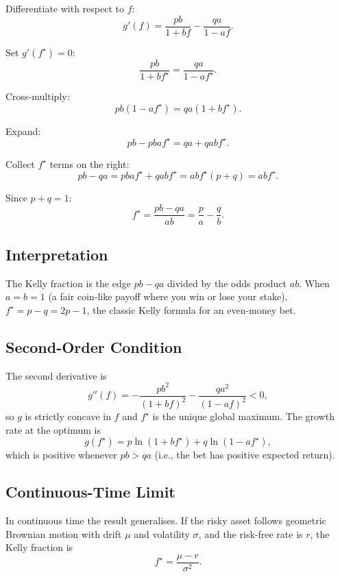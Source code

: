 Differentiate with respect to $f$:
\[
g'(f) = \frac{p b}{1 + b f} - \frac{q a}{1 - a f}.
\]

Set $g'(f^\star) = 0$:
\[
\frac{p b}{1 + b f^\star} = \frac{q a}{1 - a f^\star}.
\]

Cross-multiply:
\[
p b (1 - a f^\star) = q a (1 + b f^\star).
\]

Expand:
\[
p b - p b a f^\star = q a + q a b f^\star.
\]

Collect $f^\star$ terms on the right:
\[
p b - q a = p b a f^\star + q a b f^\star = a b f^\star (p + q) = a b f^\star.
\]

Since $p + q = 1$:
\[
\boxed{\; f^\star = \frac{p b - q a}{a b} = \frac{p}{a} - \frac{q}{b}.\;}
\]

\subsection{Interpretation}

The Kelly fraction is the edge $p b - q a$ divided by the odds product
$a b$. When $a = b = 1$ (a fair coin-like payoff where you win or lose
your stake), $f^\star = p - q = 2p - 1$, the classic Kelly formula for
an even-money bet.

\subsection{Second-Order Condition}

The second derivative is
\[
g''(f) = -\frac{p b^2}{(1 + b f)^2} - \frac{q a^2}{(1 - a f)^2} < 0,
\]
so $g$ is strictly concave in $f$ and $f^\star$ is the unique global
maximum. The growth rate at the optimum is
\[
g(f^\star) = p \ln(1 + b f^\star) + q \ln(1 - a f^\star),
\]
which is positive whenever $p b > q a$ (i.e., the bet has positive
expected return).

\subsection{Continuous-Time Limit}

In continuous time the result generalises. If the risky asset follows
geometric Brownian motion with drift $\mu$ and volatility $\sigma$, and
the risk-free rate is $r$, the Kelly fraction is
\[
f^\star = \frac{\mu - r}{\sigma^2}.
\]


